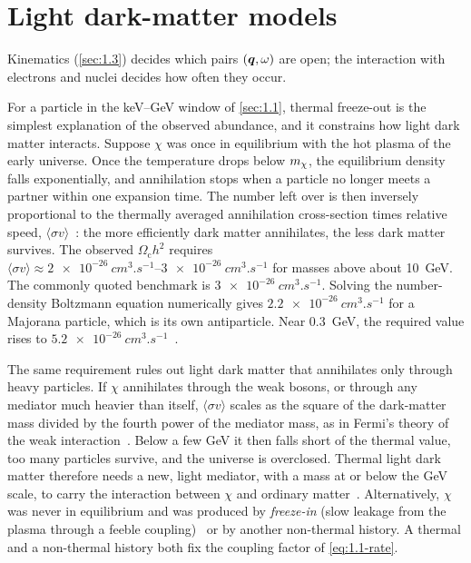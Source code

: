 \section{Light dark-matter models}\label{sec:1.4}

Kinematics (\cref{sec:1.3}) decides which pairs $(\bm{q}, \omega)$ are open; the interaction with electrons and nuclei decides how often they occur.

For a particle in the keV--GeV window of \cref{sec:1.1}, thermal freeze-out is the simplest explanation of the observed abundance, and it constrains how light dark matter interacts. Suppose $\chi$ was once in equilibrium with the hot plasma of the early universe. Once the temperature drops below $m_{\chi}$, the equilibrium density falls exponentially, and annihilation stops when a particle no longer meets a partner within one expansion time. The number left over is then inversely proportional to the thermally averaged annihilation cross-section times relative speed, $\langle\sigma v\rangle$~\cite[Eq.~(32)]{lin2019tasi}: the more efficiently dark matter annihilates, the less dark matter survives. The observed $\Omega_{\mathrm{c}}h^2$ requires $\langle\sigma v\rangle \approx \SIrange{2e-26}{3e-26}{cm^3.s^{-1}}$ for masses above about \SI{10}{GeV}. The commonly quoted benchmark is $\SI{3e-26}{cm^3.s^{-1}}$. Solving the number-density Boltzmann equation numerically gives $\SI{2.2e-26}{cm^3.s^{-1}}$ for a Majorana particle, which is its own antiparticle. Near \SI{0.3}{GeV}, the required value rises to $\SI{5.2e-26}{cm^3.s^{-1}}$~\cite[abstract and Sect.~II\,C]{steigman2012precise}.

The same requirement rules out light dark matter that annihilates only through heavy particles. If $\chi$ annihilates through the weak bosons, or through any mediator much heavier than itself, $\langle\sigma v\rangle$ scales as the square of the dark-matter mass divided by the fourth power of the mediator mass, as in Fermi's theory of the weak interaction~\cite[Eq.~(44)]{lin2019tasi}. Below a few GeV it then falls short of the thermal value, too many particles survive, and the universe is overclosed. Thermal light dark matter therefore needs a new, light mediator, with a mass at or below the GeV scale, to carry the interaction between $\chi$ and ordinary matter~\cite{boehm2004scalar}. Alternatively, $\chi$ was never in equilibrium and was produced by \emph{freeze-in} (slow leakage from the plasma through a feeble coupling)~\cite{hall2010freeze} or by another non-thermal history. A thermal and a non-thermal history both fix the coupling factor of \cref{eq:1.1-rate}.

